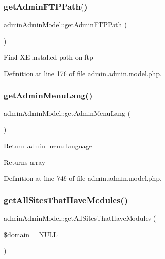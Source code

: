 \subsubsection{\texorpdfstring{get\+Admin\+F\+T\+P\+Path()}{getAdminFTPPath()}}
{\footnotesize\ttfamily admin\+Admin\+Model\+::get\+Admin\+F\+T\+P\+Path (\begin{DoxyParamCaption}{ }\end{DoxyParamCaption})}

Find XE installed path on ftp 

Definition at line 176 of file admin.\+admin.\+model.\+php.

\hypertarget{classadminAdminModel_a6e21a5731925dc94cce1859dd96e7f25}{}\label{classadminAdminModel_a6e21a5731925dc94cce1859dd96e7f25} 
\subsubsection{\texorpdfstring{get\+Admin\+Menu\+Lang()}{getAdminMenuLang()}}
{\footnotesize\ttfamily admin\+Admin\+Model\+::get\+Admin\+Menu\+Lang (\begin{DoxyParamCaption}{ }\end{DoxyParamCaption})}

Return admin menu language \begin{DoxyReturn}{Returns}
array 
\end{DoxyReturn}


Definition at line 749 of file admin.\+admin.\+model.\+php.

\hypertarget{classadminAdminModel_afca5a07a3f42ccc8c2f635557c668b44}{}\label{classadminAdminModel_afca5a07a3f42ccc8c2f635557c668b44} 
\subsubsection{\texorpdfstring{get\+All\+Sites\+That\+Have\+Modules()}{getAllSitesThatHaveModules()}}
{\footnotesize\ttfamily admin\+Admin\+Model\+::get\+All\+Sites\+That\+Have\+Modules (\begin{DoxyParamCaption}\item[{}]{\$domain = {\ttfamily NULL} }\end{DoxyParamCaption})}

